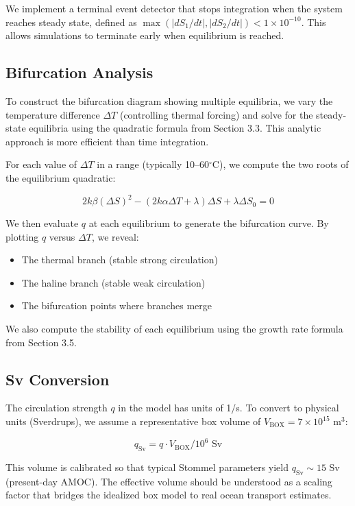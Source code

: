 \documentclass[12pt,letterpaper]{article}
\begin{document}
We implement a terminal event detector that stops integration when the system reaches steady state, defined as $\max(|dS_1/dt|, |dS_2/dt|) < 1 \times 10^{-10}$. This allows simulations to terminate early when equilibrium is reached.

\subsection{Bifurcation Analysis}

To construct the bifurcation diagram showing multiple equilibria, we vary the temperature difference $\Delta T$ (controlling thermal forcing) and solve for the steady-state equilibria using the quadratic formula from Section 3.3. This analytic approach is more efficient than time integration.

For each value of $\Delta T$ in a range (typically 10--60$^\circ$C), we compute the two roots of the equilibrium quadratic:

\begin{equation}
2k\beta(\Delta S)^2 - (2k\alpha\Delta T + \lambda)\Delta S + \lambda\Delta S_0 = 0
\end{equation}

We then evaluate $q$ at each equilibrium to generate the bifurcation curve. By plotting $q$ versus $\Delta T$, we reveal:
\begin{itemize}
\item The thermal branch (stable strong circulation)
\item The haline branch (stable weak circulation)
\item The bifurcation points where branches merge
\end{itemize}

We also compute the stability of each equilibrium using the growth rate formula from Section 3.5.

\subsection{Sv Conversion}

The circulation strength $q$ in the model has units of 1/s. To convert to physical units (Sverdrups), we assume a representative box volume of $V_{\text{BOX}} = 7 \times 10^{15}$ m$^3$:

\begin{equation}
q_{\text{Sv}} = q \cdot V_{\text{BOX}} / 10^6 \text{ Sv}
\end{equation}

This volume is calibrated so that typical Stommel parameters yield $q_{\text{Sv}} \sim 15$ Sv (present-day AMOC). The effective volume should be understood as a scaling factor that bridges the idealized box model to real ocean transport estimates.
\end{document}
